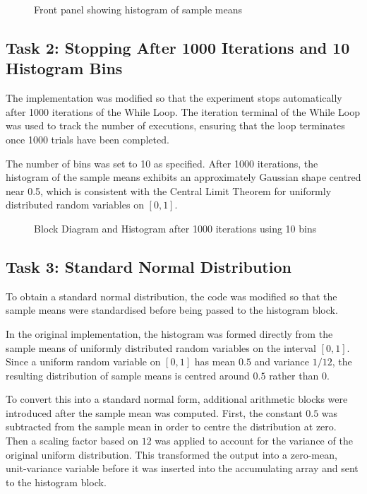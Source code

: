 \documentclass[../../main.tex]{subfiles}
\begin{document}
\begin{figure}[htbp]
    \centering
    \caption{Front panel showing histogram of sample means}
\end{figure}

\FloatBarrier

\subsection{Task 2: Stopping After 1000 Iterations and 10 Histogram Bins}

The implementation was modified so that the experiment stops automatically after 1000 iterations of the While Loop. The iteration terminal of the While Loop was used to track the number of executions, ensuring that the loop terminates once 1000 trials have been completed.

 The number of bins was set to 10 as specified. After 1000 iterations, the histogram of the sample means exhibits an approximately Gaussian shape centred near 0.5, which is consistent with the Central Limit Theorem for uniformly distributed random variables on $[0,1]$.

\begin{figure}[htbp]
    \centering
    \caption{Block Diagram and Histogram after 1000 iterations using 10 bins}
\end{figure}

\FloatBarrier

\subsection{Task 3: Standard Normal Distribution}

To obtain a standard normal distribution, the code was modified so that the sample means were standardised before being passed to the histogram block.

In the original implementation, the histogram was formed directly from the sample means of uniformly distributed random variables on the interval $[0,1]$. Since a uniform random variable on $[0,1]$ has mean $0.5$ and variance $1/12$, the resulting distribution of sample means is centred around $0.5$ rather than $0$.

To convert this into a standard normal form, additional arithmetic blocks were introduced after the sample mean was computed. First, the constant $0.5$ was subtracted from the sample mean in order to centre the distribution at zero. Then a scaling factor based on $12$ was applied to account for the variance of the original uniform distribution. This transformed the output into a zero-mean, unit-variance variable before it was inserted into the accumulating array and sent to the histogram block.
\end{document}

